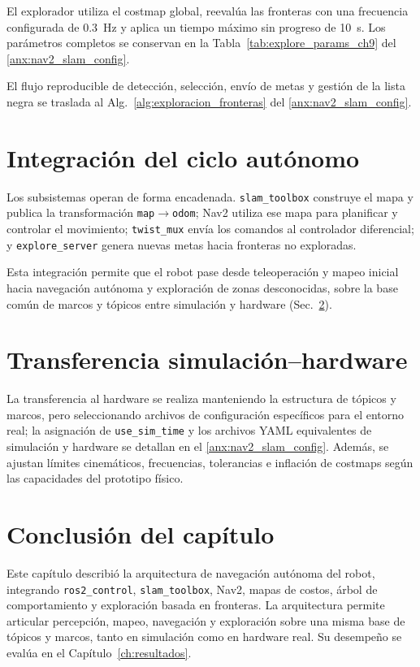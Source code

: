 El explorador utiliza el costmap global, reevalúa las fronteras con una
frecuencia configurada de 0.3~Hz y aplica un tiempo máximo sin progreso de
10~s. Los parámetros completos se conservan en la
Tabla~\ref{tab:explore_params_ch9} del \ref{anx:nav2_slam_config}.

El flujo reproducible de detección, selección, envío de metas y gestión
de la lista negra se traslada al Alg.~\ref{alg:exploracion_fronteras} del
\ref{anx:nav2_slam_config}.

\section{Integración del ciclo autónomo}
\label{sec:integracion_ciclo}

Los subsistemas operan de forma encadenada. \texttt{slam\_toolbox} construye el mapa y publica la transformación \texttt{map}$\rightarrow$\texttt{odom}; Nav2 utiliza ese mapa para planificar y controlar el movimiento; \texttt{twist\_mux} envía los comandos al controlador diferencial; y \texttt{explore\_server} genera nuevas metas hacia fronteras no exploradas.

Esta integración permite que el robot pase desde teleoperación y mapeo inicial hacia navegación autónoma y exploración de zonas desconocidas, sobre la base común de marcos y tópicos entre simulación y hardware (Sec.~\ref{sec:verificacion_ch9}).

\section{Transferencia simulación--hardware}
\label{sec:verificacion_ch9}

La transferencia al hardware se realiza manteniendo la estructura de tópicos y marcos, pero seleccionando archivos de configuración específicos para el entorno real; la asignación de \texttt{use\_sim\_time} y los archivos YAML equivalentes de simulación y hardware se detallan en el \ref{anx:nav2_slam_config}. Además, se ajustan límites cinemáticos, frecuencias, tolerancias e inflación de costmaps según las capacidades del prototipo físico.

\section*{Conclusión del capítulo}
\label{sec:conclusion_ch9}

Este capítulo describió la arquitectura de navegación autónoma del robot, integrando \texttt{ros2\_control}, \texttt{slam\_toolbox}, Nav2, mapas de costos, árbol de comportamiento y exploración basada en fronteras. La arquitectura permite articular percepción, mapeo, navegación y exploración sobre una misma base de tópicos y marcos, tanto en simulación como en hardware real. Su desempeño se evalúa en el Capítulo~\ref{ch:resultados}.